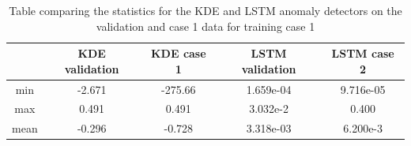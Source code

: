        \begin{table}[]
            \centering
            \begin{tabular}{|c|c|c|c|c|}
                \hline
                            & KDE validation  & KDE case 1    & LSTM validation & LSTM case 2   \\ \hline
                min         & -2.671    & -275.66           & 1.659e-04 & 9.716e-05         \\ \hline
                max         & 0.491     & 0.491             & 3.032e-2  & 0.400             \\ \hline
                mean        & -0.296    & -0.728            & 3.318e-03 & 6.200e-3          \\ \hline
            \end{tabular}
            \caption{Table comparing the statistics for the KDE and LSTM anomaly detectors on the validation and case 1 data for training case 1}
            \label{tab:trainining_plant1_stats}
        \end{table}
        
